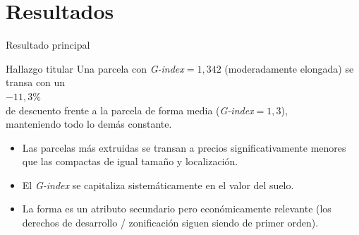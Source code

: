 \documentclass[11pt,aspectratio=169]{beamer}
\newcommand{\Gindex}{\textit{G-index}\xspace}
\begin{document}
\section{Resultados}
\begin{frame}{Resultado principal}
  \begin{block}{Hallazgo titular}
    \centering
    \large Una parcela con \Gindex $=1{,}342$ (moderadamente elongada) se transa con un \\[0.3em]
    \alert{\Huge $-11{,}3\%$} \\[0.3em]
    \large de descuento frente a la parcela de forma media (\Gindex $=1{,}3$), \\ manteniendo todo lo demás constante.
  \end{block}
  \vspace{0.4em}
  \begin{itemize}\small
    \item Las parcelas más extruidas se transan a precios significativamente menores que las compactas de igual tamaño y localización.
    \item El \Gindex se capitaliza \alert{sistemáticamente} en el valor del suelo.
    \item La forma es un atributo \alert{secundario pero económicamente relevante} (los derechos de desarrollo / zonificación siguen siendo de primer orden).
  \end{itemize}
\end{frame}
\end{document}
